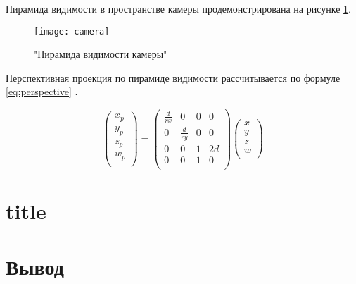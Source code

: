 Пирамида видимости в пространстве камеры продемонстрирована на рисунке \ref{fig:camera}.

\begin{figure}[H]
	\centering
	\texttt{[image: camera]}
	\caption{"Пирамида видимости камеры"}
	\label{fig:camera}
\end{figure}

Перспективная проекция по пирамиде видимости рассчитывается по формуле \ref{eq:perspective} \cite{projection}.

\begin{equation}
	\label{eq:perspective}
	\begin{pmatrix}
		x_p \\
		y_p \\
		z_p \\
		w_p \\
	\end{pmatrix} = 
	\begin{pmatrix}
		\frac{d}{rx}  & 0 & 0 & 0 \\
		0 & \frac{d}{ry} & 0 & 0 \\
		0 & 0 & 1 & 2d \\
		0 & 0 & 1 & 0 \\
	\end{pmatrix}
	\begin{pmatrix}
		x \\
		y \\
		z \\
		w \\
	\end{pmatrix}
\end{equation}

\section{title}

\section*{Вывод}

\clearpage
